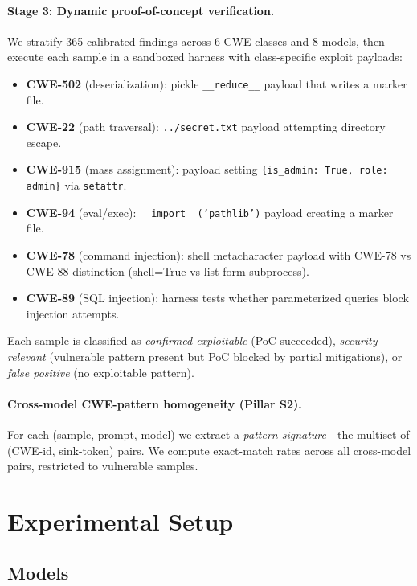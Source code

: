 \documentclass{article}
\newcommand{\code}[1]{\texttt{#1}}
\begin{document}
\paragraph{Stage 3: Dynamic proof-of-concept verification.}
We stratify 365 calibrated findings across 6 CWE classes and 8 models, then
execute each sample in a sandboxed harness with class-specific exploit
payloads:
\begin{itemize}[leftmargin=*]
  \item \textbf{CWE-502} (deserialization): pickle \code{\_\_reduce\_\_}
    payload that writes a marker file.
  \item \textbf{CWE-22} (path traversal): \code{../secret.txt} payload
    attempting directory escape.
  \item \textbf{CWE-915} (mass assignment): payload setting
    \code{\{is\_admin: True, role: admin\}} via \code{setattr}.
  \item \textbf{CWE-94} (eval/exec): \code{\_\_import\_\_('pathlib')}
    payload creating a marker file.
  \item \textbf{CWE-78} (command injection): shell metacharacter payload with
    CWE-78 vs CWE-88 distinction (shell=True vs list-form subprocess).
  \item \textbf{CWE-89} (SQL injection): harness tests whether parameterized
    queries block injection attempts.
\end{itemize}

Each sample is classified as \emph{confirmed exploitable} (PoC succeeded),
\emph{security-relevant} (vulnerable pattern present but PoC blocked by
partial mitigations), or \emph{false positive} (no exploitable pattern).

\paragraph{Cross-model CWE-pattern homogeneity (Pillar S2).}
For each (sample, prompt, model) we extract a \emph{pattern signature}---the
multiset of (CWE-id, sink-token) pairs. We compute exact-match rates across
all cross-model pairs, restricted to vulnerable samples.

\section{Experimental Setup}
\label{sec:setup}

\subsection{Models}
\end{document}
